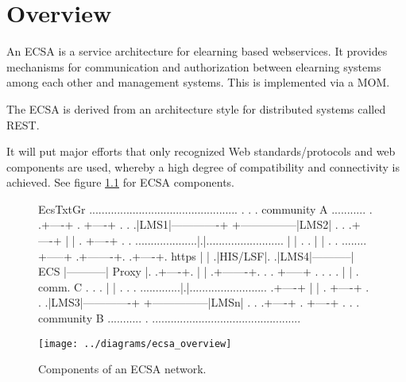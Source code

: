 \chapter{Overview}

An ECSA
is a service architecture for elearning based webservices. It provides
mechanisms for communication and authorization between elearning systems among
each other and management systems. This is implemented via a
MOM.

The ECSA is derived from an architecture style for distributed systems
called REST. 

It will put major efforts that only recognized Web standards/protocols
and web components are used, whereby a high degree of compatibility
and connectivity is achieved. See figure \ref{fig:ecsa_components}
for ECSA components.

\begin{figure}
\noindent \begin{centering}
\begin{SaveVerbatim}{EcsTxtGr}
................................................
.                                              .
.            community A           ........... .
.+----+                            .  +----+ . .
.|LMS1|-------------+ +---------------|LMS2| . .
.+----+             | |            .  +----+ . .
....................|.|.........................
                    | |            .         . 
                    | |            .         . 
........          +-----+          .+-------+. 
.+----+.  https   |     |          .|HIS/LSF|. 
.|LMS4|-----------| ECS |-----------| Proxy |. 
.+----+.          |     |          .+-------+. 
.      .          +-----+          .         . 
.      .            | |            . comm. C . 
.      .            | |            .         . 
.      .............|.|.........................
.+----+             | |            .  +----+ . .
.|LMS3|-------------+ +---------------|LMSn| . .
.+----+                            .  +----+ . .
.            community B           ........... .
................................................

\end{SaveVerbatim}
%
  {}%
  {\texttt{[image: ../diagrams/ecsa\_overview]}}
\par\end{centering}
\caption[ECSA components.]{\label{fig:ecsa_components}Components of an ECSA network.}
\end{figure}

